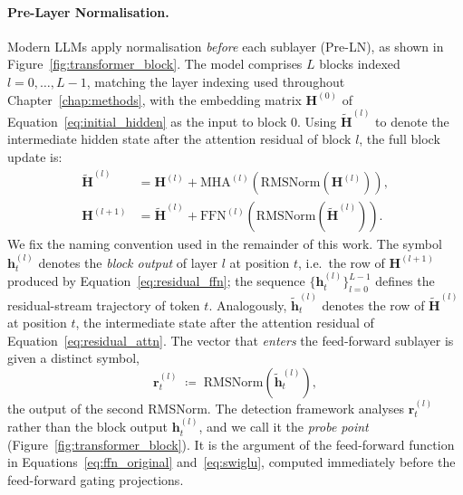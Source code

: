 \paragraph{Pre-Layer Normalisation.}
Modern LLMs apply normalisation \emph{before} each sublayer (Pre-LN), as shown in
Figure~\ref{fig:transformer_block}. The model comprises $L$ blocks indexed
$l = 0, \ldots, L-1$, matching the layer indexing used throughout
Chapter~\ref{chap:methods}, with the embedding matrix
$\mathbf{H}^{(0)}$ of Equation~\eqref{eq:initial_hidden} as the input to
block $0$. Using $\tilde{\mathbf{H}}^{(l)}$ to denote the
intermediate hidden state after the attention residual of block $l$, the full
block update is:
\begin{align}
    \tilde{\mathbf{H}}^{(l)} &= \mathbf{H}^{(l)}
        + \mathrm{MHA}^{(l)}\!\left(\mathrm{RMSNorm}\!\left(\mathbf{H}^{(l)}\right)\right),
    \label{eq:residual_attn} \\
    \mathbf{H}^{(l+1)} &= \tilde{\mathbf{H}}^{(l)}
        + \mathrm{FFN}^{(l)}\!\left(\mathrm{RMSNorm}\!\left(\tilde{\mathbf{H}}^{(l)}\right)\right).
    \label{eq:residual_ffn}
\end{align}
We fix the naming convention used in the remainder of this work. The symbol
$\mathbf{h}_t^{(l)}$ denotes the \emph{block output} of layer $l$ at position
$t$, i.e.\ the row of $\mathbf{H}^{(l+1)}$ produced by
Equation~\eqref{eq:residual_ffn}; the sequence
$\{\mathbf{h}_t^{(l)}\}_{l=0}^{L-1}$ defines
the residual-stream trajectory of token $t$. Analogously,
$\tilde{\mathbf{h}}_t^{(l)}$ denotes the row of $\tilde{\mathbf{H}}^{(l)}$ at
position $t$, the intermediate state after the attention residual of
Equation~\eqref{eq:residual_attn}. The vector that \emph{enters} the
feed-forward sublayer is given a distinct symbol,
\begin{equation}
    \mathbf{r}_t^{(l)} \;\coloneqq\;
    \mathrm{RMSNorm}\!\left(\tilde{\mathbf{h}}_t^{(l)}\right),
    \label{eq:probe_point}
\end{equation}
the output of the second RMSNorm. The detection framework analyses
$\mathbf{r}_t^{(l)}$ rather than the block output $\mathbf{h}_t^{(l)}$, and we
call it the \emph{probe point} (Figure~\ref{fig:transformer_block}). It is the
argument of the feed-forward function in Equations~\eqref{eq:ffn_original}
and~\eqref{eq:swiglu}, computed immediately before the feed-forward gating
projections.

